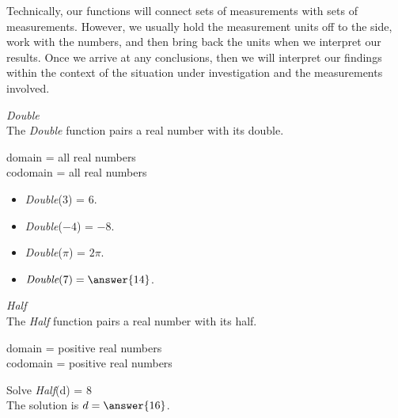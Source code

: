 \documentclass{ximera}
\begin{document}
Technically, our functions will connect sets of measurements with sets of measurements. However, we usually hold the measurement units off to the side, work with the numbers, and then bring back the units when we interpret our results.  Once we arrive at any conclusions, then we will interpret our findings within the context of the situation under investigation and the measurements involved.




\begin{question} \textit{Double} \\
The \textit{Double} function pairs a real number with its double.

domain = all real numbers  \\ 
codomain = all real numbers


\begin{itemize}
\item \textit{Double}($3$) = $6$.
\item \textit{Double}($-4$) = $-8$.
\item \textit{Double}($\pi$) = $2 \pi$.

\item $\textit{Double}(7) = \answer{14}$.
\end{itemize}

\end{question} 



\begin{question} \textit{Half} \\
The \textit{Half} function pairs a real number with its half.

domain = positive real numbers  \\ 
codomain = positive real numbers


Solve \textit{Half}(d) = $8$ \\

The solution is $d = \answer{16}$.

\end{question} 
\end{document}
